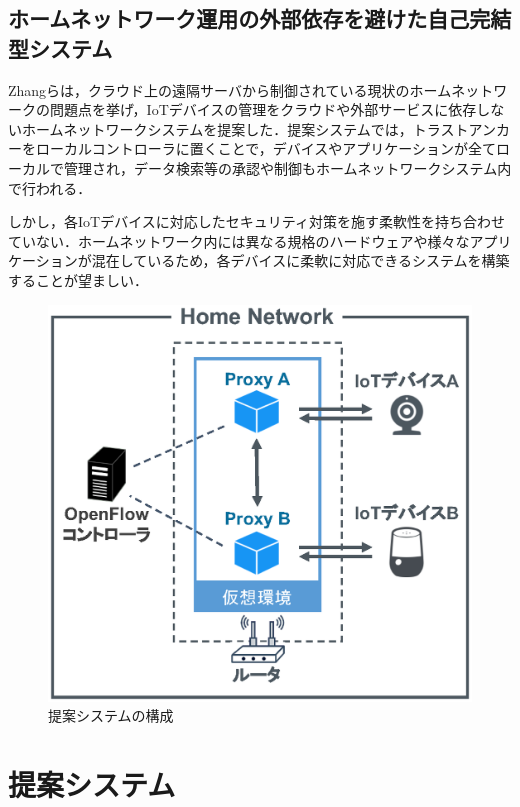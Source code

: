 \documentclass[Japanese]{dicomopapers}
\begin{document}
\subsection{ホームネットワーク運用の外部依存を避けた自己完結型システム}
Zhangらは，クラウド上の遠隔サーバから制御されている現状のホームネットワークの問題点を挙げ，IoTデバイスの管理をクラウドや外部サービスに依存しないホームネットワークシステムを提案した\cite{sover}．提案システムでは，トラストアンカーをローカルコントローラに置くことで，デバイスやアプリケーションが全てローカルで管理され，データ検索等の承認や制御もホームネットワークシステム内で行われる．\par
しかし，各IoTデバイスに対応したセキュリティ対策を施す柔軟性を持ち合わせていない．ホームネットワーク内には異なる規格のハードウェアや様々なアプリケーションが混在しているため，各デバイスに柔軟に対応できるシステムを構築することが望ましい．

\begin{figure}[!tb]
	\centering
	\includegraphics[width=\linewidth]{img/system.eps}
	\caption{提案システムの構成}
	\label{fig:system}
\end{figure}

\section{提案システム}
\end{document}
